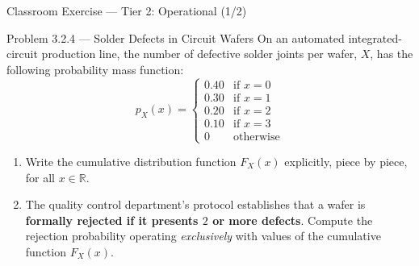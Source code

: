 \documentclass[aspectratio=169,xcolor={dvipsnames,table}]{beamer}
\begin{document}
\begin{frame}{Classroom Exercise --- Tier 2: Operational (1/2)}
	\begin{block}{Problem 3.2.4 --- Solder Defects in Circuit Wafers}
		\footnotesize
		On an automated integrated-circuit production line, the number of defective solder joints per wafer, $X$, has the following probability mass function:
		$$p_X(x) = \begin{cases}
			0.40 & \text{if } x = 0 \\
			0.30 & \text{if } x = 1 \\
			0.20 & \text{if } x = 2 \\
			0.10 & \text{if } x = 3 \\
			0 & \text{otherwise}
		\end{cases}$$
		\begin{enumerate}\itemsep=0.04cm
			\item Write the cumulative distribution function $F_X(x)$ explicitly, piece by piece, for all $x \in \mathbb{R}$.
			\item The quality control department's protocol establishes that a wafer is \textbf{formally rejected if it presents $2$ or more defects}. Compute the rejection probability operating \emph{exclusively} with values of the cumulative function $F_X(x)$.
		\end{enumerate}
	\end{block}
\end{frame}
\end{document}
